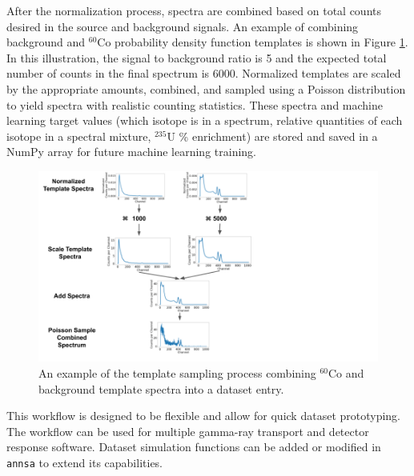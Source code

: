 After the normalization process, spectra are combined based on total counts desired in the source and background signals. An example of combining background and $^{60}$Co probability density function templates is shown in Figure \ref{fig:template_sampling_diagram}. In this illustration, the signal to background ratio is 5 and the expected total number of counts in the final spectrum is 6000. Normalized templates are scaled by the appropriate amounts, combined, and sampled using a Poisson distribution to yield spectra with realistic counting statistics. These spectra and machine learning target values (which isotope is in a spectrum, relative quantities of each isotope in a spectral mixture, $^{235}$U \% enrichment) are stored and saved in a NumPy array for future machine learning training.

\begin{figure}[H]
	\centering
	\includegraphics[trim=0 0 350 0,clip,width=1.0\linewidth]{images/template_sampling_diagram.png}
	\caption{An example of the template sampling process combining $^{60}$Co and background template spectra into a dataset entry.}
	\label{fig:template_sampling_diagram}
\end{figure}

This workflow is designed to be flexible and allow for quick dataset prototyping. The workflow can be used for multiple gamma-ray transport and detector response software. Dataset simulation functions can be added or modified in \verb|annsa| to extend its capabilities.




